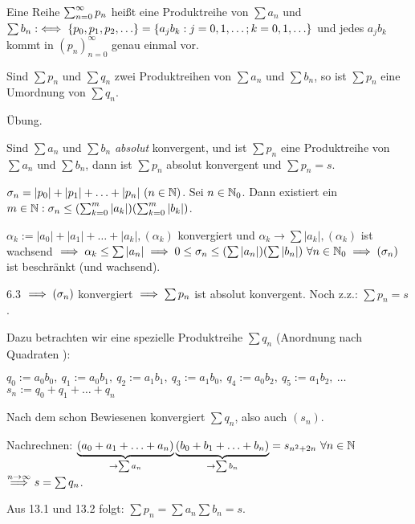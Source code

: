 \documentclass[a4paper,twoside,DIV15,BCOR12mm]{scrbook}
\begin{document}
\begin{definition}
Eine Reihe $\sum_{n=0}^{\infty}{p_n}$ heißt eine Produktreihe von $\sum{a_n}$ und $\sum{b_n} :\iff \{p_0,p_1,p_2,\ldots\} = \{a_j b_k: j=0,1,\ldots; k=0,1,\ldots\}$ und jedes $a_j b_k$ kommt in $(p_n)_{n=0}^{\infty}$ genau einmal vor.
\end{definition}

\begin{satz}
Sind $\sum{p_n}$ und $\sum{q_n}$ zwei Produktreihen von $\sum{a_n}$ und $\sum{b_n}$, so ist $\sum{p_n}$ eine Umordnung von $\sum{q_n}$.
\end{satz}

\begin{beweis}
Übung.
\end{beweis}

\begin{satz}
Sind $\sum{a_n}$ und $\sum{b_n}$ \emph{absolut} konvergent, und ist $\sum{p_n}$ eine Produktreihe von $\sum{a_n}$ und $\sum{b_n}$, dann ist $\sum{p_n}$ absolut konvergent und $\sum{p_n} = s$.
\end{satz}

\begin{beweis}
$\sigma_n = |p_0|+|p_1|+\ldots+|p_n|\ (n\in\MdN)$. Sei $n\in\mathbb{N}_0$. Dann existiert ein $m\in\mathbb{N}: \sigma_n \le (\sum_{k=0}^{m}{|a_k|})(\sum_{k=0}^{m}{|b_k|})$.

$\alpha_k := |a_0|+|a_1|+\ldots+|a_k|, (\alpha_k)$ konvergiert und $\alpha_k \to \sum{|a_k|}, (\alpha_k)$ ist wachsend $\implies \alpha_k \le \sum{|a_n|} \implies 0 \le \sigma_n \le (\sum{|a_n|})(\sum{|b_n|})\ \forall n\in\mathbb{N}_0 \implies (\sigma_n)$ ist beschränkt (und wachsend).

6.3 $\implies (\sigma_n)$ konvergiert $\implies \sum{p_n}$ ist absolut konvergent. Noch z.z.: $\sum{p_n} = s$.

Dazu betrachten wir eine spezielle Produktreihe $\sum{q_n}$ (\glqq Anordnung nach Quadraten \grqq):


$q_0 := a_0b_0,\ q_1 := a_0b_1,\ q_2 := a_1b_1,\ q_3 := a_1b_0,\ q_4 := a_0b_2,\ q_5 := a_1b_2,\ \ldots$ \\
$s_n := q_0+q_1+\ldots+q_n$

Nach dem schon Bewiesenen konvergiert $\sum{q_n}$, also auch $(s_n)$.

Nachrechnen: $\underbrace{(a_0+a_1+\ldots+a_n)}_{\to\sum{a_n}} \underbrace{(b_0+b_1+\ldots+b_n)}_{\to\sum{b_n}} = s_{n^2+2n}\ \forall n\in\mathbb{N}$\\
$\overset{n\to\infty}{\implies} s = \sum{q_n}$.

Aus 13.1 und 13.2 folgt: $\sum{p_n} = \sum{a_n} \sum{b_n} = s.$
\end{beweis}
\end{document}
